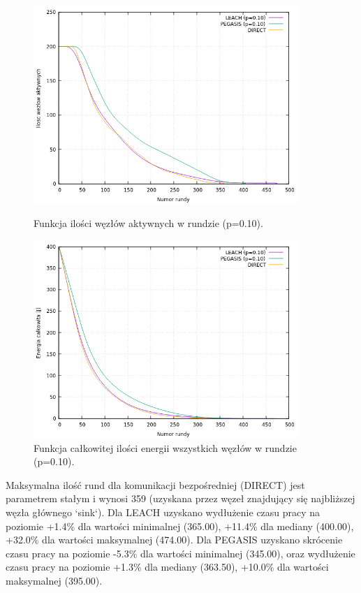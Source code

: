 \documentclass[a4paper,12pt,twoside,openany]{report}
\begin{document}
\begin{figure}[H]
 \centering
 \includegraphics[width=10cm]{images/gnuplot/test_4/nodes_in_round_p010.png}
 \caption{Funkcja ilości węzłów aktywnych w rundzie (p=0.10).}
 \includegraphics[width=10cm]{images/gnuplot/test_4/energy_in_round_p010.png}
 \caption{Funkcja całkowitej ilości energii wszystkich węzłów w rundzie (p=0.10).}
\end{figure}

\par
Maksymalna ilość rund dla komunikacji bezpośredniej (DIRECT) jest parametrem stałym i wynosi 359 (uzyskana przez węzeł znajdujący się najbliższej węzła głównego `sink`).
Dla LEACH uzyskano wydłużenie czasu pracy na poziomie +1.4\% dla wartości minimalnej (365.00), +11.4\% dla mediany (400.00), +32.0\% dla wartości maksymalnej (474.00).
Dla PEGASIS uzyskano skrócenie czasu pracy na poziomie -5.3\% dla wartości minimalnej (345.00), oraz wydłużenie czasu pracy na poziomie +1.3\% dla mediany (363.50), +10.0\% dla wartości maksymalnej (395.00).
\end{document}
